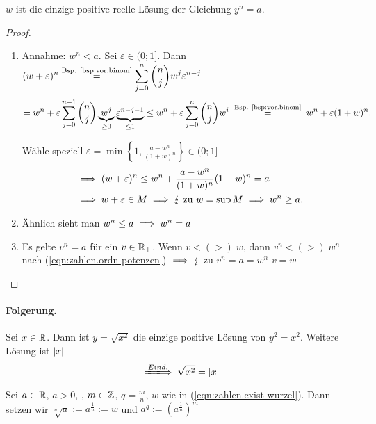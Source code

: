 \documentclass[12pt]{scrreprt}
\begin{document}
\begin{lem}\label{lem:zahlen.wurzel}
$w$ ist die einzige positive reelle Lösung der Gleichung $y^n = a$.
\end{lem}
\begin{proof}
\begin{enumerate}
\item Annahme: $w^n<a$. Sei $\varepsilon \in (0;1]$. Dann $\displaystyle(w+\varepsilon)^n \stackrel{\text{Bsp. \ref{bsp:vor.binom}}}{=} \sum^n_{j=0}\binom{n}{j}w^j\varepsilon^{n-j}$
\[= w^n+ \varepsilon \sum^{n-1}_{j=0}\binom{n}{j}\underbrace{w^j}_{\ge 0}\underbrace{\varepsilon^{n-j-1}}_{\le1}
\le w^n + \varepsilon \sum^n_{j=0}\binom{n}{j}w^i \nach{=}{\text{Bsp. \ref{bsp:vor.binom}}} w^n + \varepsilon (1+w)^n.\]

Wähle speziell $\displaystyle\varepsilon= \min \left\{1,\frac{a-w^n}{(1+w)^n}\right\} \in (0;1]$
\begin{align}
&\implies (w+\varepsilon)^n \le w^n +\frac{a-w^n}{(1+w)^n} (1+w)^n=a\nonumber\\
&\implies w+ \varepsilon \in M \implies \lightning\ \text{zu\ } w=\sup  M \implies w^n \ge a.\nonumber
\end{align}
\item Ähnlich sieht man $w^n \le a \implies w^n = a$
\item Es gelte $v^n=a$ für ein $v \in \mathbb{R}_+$. Wenn $v<(>)\;w$, dann $v^n <(>)\;w^n$ nach (\ref{eqn:zahlen.ordn-potenzen}) $\implies \lightning$
zu $v^n = a = w^n$ \folgt $v=w$
\end{enumerate}
\end{proof}

\paragraph{Folgerung.}
Sei $x \in \mathbb{R}$. Dann ist $y = \sqrt{x^2}$ die einzige positive Lösung von $y^2 = x^2$. Weitere Lösung ist $\left\lvert x\right\lvert$
\begin{equation}
\folgtwegen{Eind.}\sqrt{x^2} = \abs{x}
\label{eqn:zahlen.betrag-wurzel}
\end{equation}
\begin{dfn}\label{dfn:zahlen.wurzel}
Sei $a \in \mathbb{R}$, $a > 0$, , $m \in \mathbb{Z}$, $q=\frac{m}{n}$, $w$ wie in (\ref{eqn:zahlen.exist-wurzel}).
Dann setzen wir $\sqrt[n]{a} := a^{\frac{1}{n}} := w$ und $a^q:=(a^{\frac{1}{n}})^m$
\end{dfn}
\end{document}
